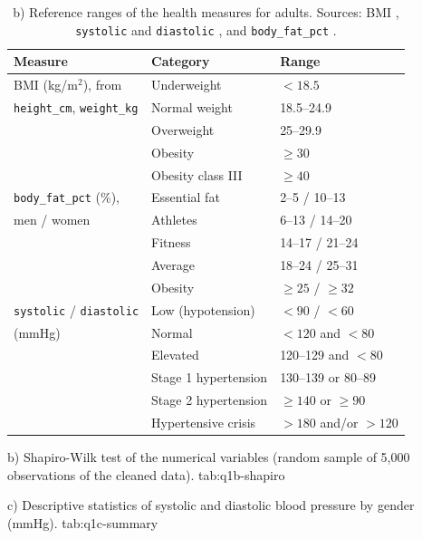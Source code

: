 \begin{table}[htbp]
  \centering
  \footnotesize
  \caption{b) Reference ranges of the health measures for adults. Sources: BMI \citep{clevelandclinic_bmi}, \texttt{systolic} and \texttt{diastolic} \citep{clevelandclinic_bp}, and \texttt{body\_fat\_pct} \citep{ace_bodyfat}.}
  \label{tab:q1b-reference}
  \begin{tabular}{lll}
    \toprule
    Measure & Category & Range \\
    \midrule
    BMI (kg/m$^2$), from
      & Underweight           & $< 18.5$ \\
    \quad \texttt{height\_cm}, \texttt{weight\_kg}
      & Normal weight         & 18.5--24.9 \\
      & Overweight            & 25--29.9 \\
      & Obesity               & $\geq 30$ \\
      & Obesity class III     & $\geq 40$ \\
    \midrule
    \texttt{body\_fat\_pct} (\%),
      & Essential fat         & 2--5 / 10--13 \\
    \quad men / women
      & Athletes              & 6--13 / 14--20 \\
      & Fitness               & 14--17 / 21--24 \\
      & Average               & 18--24 / 25--31 \\
      & Obesity               & $\geq 25$ / $\geq 32$ \\
    \midrule
    \texttt{systolic} / \texttt{diastolic}
      & Low (hypotension)     & $< 90$ / $< 60$ \\
    \quad (mmHg)
      & Normal                & $< 120$ and $< 80$ \\
      & Elevated              & 120--129 and $< 80$ \\
      & Stage 1 hypertension  & 130--139 or 80--89 \\
      & Stage 2 hypertension  & $\geq 140$ or $\geq 90$ \\
      & Hypertensive crisis   & $> 180$ and/or $> 120$ \\
    \bottomrule
  \end{tabular}
\end{table}

  {b) Shapiro-Wilk test of the numerical variables (random sample of 5,000 observations of the cleaned data).}
  {tab:q1b-shapiro}

  {c) Descriptive statistics of systolic and diastolic blood pressure by gender (mmHg).}
  {tab:q1c-summary}

